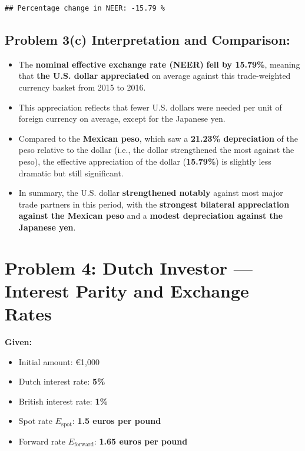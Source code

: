 \documentclass[
]{article}
\providecommand{\tightlist}{%
  \setlength{\itemsep}{0pt}\setlength{\parskip}{0pt}}
\begin{document}
\begin{verbatim}
## Percentage change in NEER: -15.79 %
\end{verbatim}

\subsection{Problem 3(c) Interpretation and
Comparison:}\label{problem-3c-interpretation-and-comparison}

\begin{itemize}
\tightlist
\item
  The \textbf{nominal effective exchange rate (NEER)} \textbf{fell by
  15.79\%}, meaning that \textbf{the U.S. dollar appreciated} on average
  against this trade-weighted currency basket from 2015 to 2016.
\item
  This appreciation reflects that fewer U.S. dollars were needed per
  unit of foreign currency on average, except for the Japanese yen.
\item
  Compared to the \textbf{Mexican peso}, which saw a \textbf{21.23\%
  depreciation} of the peso relative to the dollar (i.e., the dollar
  strengthened the most against the peso), the effective appreciation of
  the dollar (\textbf{15.79\%}) is slightly less dramatic but still
  significant.
\item
  In summary, the U.S. dollar \textbf{strengthened notably} against most
  major trade partners in this period, with the \textbf{strongest
  bilateral appreciation against the Mexican peso} and a \textbf{modest
  depreciation against the Japanese yen}.
\end{itemize}

\section{Problem 4: Dutch Investor --- Interest Parity and Exchange
Rates}\label{problem-4-dutch-investor-interest-parity-and-exchange-rates}

\textbf{Given:}

\begin{itemize}
\item
  Initial amount: €1,000
\item
  Dutch interest rate: \textbf{5\%}
\item
  British interest rate: \textbf{1\%}
\item
  Spot rate \(E_{\text{spot}}\): \textbf{1.5 euros per pound}
\item
  Forward rate \(E_{\text{forward}}\): \textbf{1.65 euros per pound}
\end{itemize}
\end{document}
